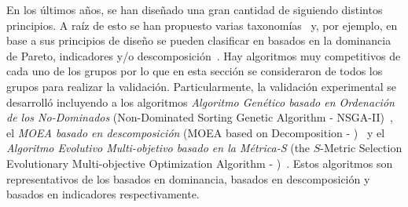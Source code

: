En los últimos años, se han diseñado una gran cantidad de \MOEAS{} siguiendo distintos principios.
%
A raíz de esto se han propuesto varias taxonomías~\cite{Joel:BOOK_MOEAs} y, por ejemplo, en base a sus principios de diseño
se pueden clasificar en basados en la dominancia de Pareto, indicadores y/o descomposición~\cite{pilat2010evolutionary}.
%
Hay algoritmos muy competitivos de cada uno de los grupos por lo que en esta sección se consideraron \MOEAS{} de todos los grupos para realizar la validación.
%
Particularmente, la validación experimental se desarrolló incluyendo a los algoritmos \textit{Algoritmo Genético basado en Ordenación de los No-Dominados} 
(Non-Dominated Sorting Genetic Algorithm - NSGA-II)~\cite{Joel:NSGAII}, el \textit{MOEA basado en descomposición} (MOEA based on Decomposition - \MOEAD{})~\cite{Joel:MOEAD} 
y el \textit{Algoritmo Evolutivo Multi-objetivo basado en la Métrica-S} (the $S$-Metric Selection Evolutionary Multi-objective Optimization Algorithm - \SMSEMOA{})~\cite{Joel:SMSEMOA}.
%
Estos algoritmos son representativos de los basados en dominancia, basados en descomposición y basados en indicadores respectivamente.
%

